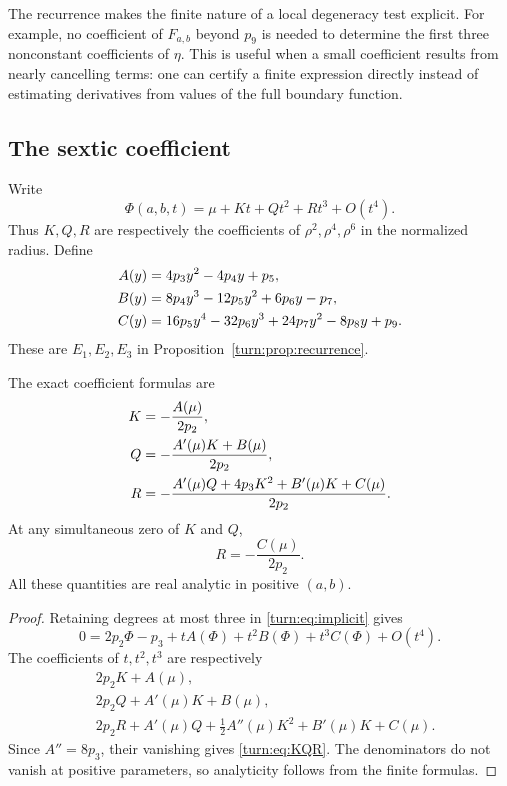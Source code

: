 The recurrence makes the finite nature of a local degeneracy test
explicit.  For example, no coefficient of $F_{a,b}$ beyond $p_9$ is
needed to determine the first three nonconstant coefficients of
$\eta$.  This is useful when a small coefficient results from nearly
cancelling terms: one can certify a finite expression directly instead
of estimating derivatives from values of the full boundary function.

\subsection{The sextic coefficient}
\label{turn:sec:sextic}

Write
\begin{equation}
 \Phi(a,b,t)=\mu+Kt+Qt^2+Rt^3+O(t^4).
 \label{turn:eq:expansion}
\end{equation}
Thus $K,Q,R$ are respectively the coefficients of
$\rho^2,\rho^4,\rho^6$ in the normalized radius.  Define
\begin{align}
 A(y)&=4p_3y^2-4p_4y+p_5,\notag\\
 B(y)&=8p_4y^3-12p_5y^2+6p_6y-p_7,\notag\\
 C(y)&=16p_5y^4-32p_6y^3+24p_7y^2-8p_8y+p_9.
 \label{turn:eq:ABC}
\end{align}
These are $E_1,E_2,E_3$ in Proposition~\ref{turn:prop:recurrence}.

\begin{proposition}
\label{turn:prop:sextic}
The exact coefficient formulas are
\begin{align}
 K&=-\frac{A(\mu)}{2p_2},\notag\\
 Q&=-\frac{A'(\mu)K+B(\mu)}{2p_2},\notag\\
 R&=-\frac{A'(\mu)Q+4p_3K^2+B'(\mu)K+C(\mu)}{2p_2}.
 \label{turn:eq:KQR}
\end{align}
At any simultaneous zero of $K$ and $Q$,
\begin{equation}
 R=-\frac{C(\mu)}{2p_2}.
 \label{turn:eq:Rzero}
\end{equation}
All these quantities are real analytic in positive $(a,b)$.
\end{proposition}

\begin{proof}
Retaining degrees at most three in \eqref{turn:eq:implicit} gives
\[
 0=2p_2\Phi-p_3+tA(\Phi)+t^2B(\Phi)+t^3C(\Phi)+O(t^4).
\]
The coefficients of $t,t^2,t^3$ are respectively
\begin{align*}
 &2p_2K+A(\mu),\\
 &2p_2Q+A'(\mu)K+B(\mu),\\
 &2p_2R+A'(\mu)Q+\tfrac12A''(\mu)K^2+B'(\mu)K+C(\mu).
\end{align*}
Since $A''=8p_3$, their vanishing gives
\eqref{turn:eq:KQR}.  The denominators do not vanish at positive
parameters, so analyticity follows from the finite formulas.
\end{proof}

